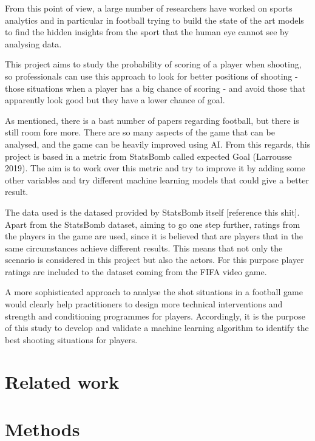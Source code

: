 \documentclass[]{article}
\begin{document}
From this point of view, a large number of researchers have worked on
sports analytics and in particular in football trying to build the state
of the art models to find the hidden insights from the sport that the
human eye cannot see by analysing data.

This project aims to study the probability of scoring of a player when
shooting, so professionals can use this approach to look for better
positions of shooting - those situations when a player has a big chance
of scoring - and avoid those that apparently look good but they have a
lower chance of goal.

As mentioned, there is a bast number of papers regarding football, but
there is still room fore more. There are so many aspects of the game
that can be analysed, and the game can be heavily improved using AI.
From this regards, this project is based in a metric from StatsBomb
called expected Goal (Larrousse 2019). The aim is to work over this
metric and try to improve it by adding some other variables and try
different machine learning models that could give a better result.

The data used is the datased provided by StatsBomb itself {[}reference
this shit{]}. Apart from the StatsBomb dataset, aiming to go one step
further, ratings from the players in the game are used, since it is
believed that are players that in the same circumstances achieve
different results. This means that not only the scenario is considered
in this project but also the actors. For this purpose player ratings are
included to the dataset coming from the FIFA video game.

A more sophisticated approach to analyse the shot situations in a
football game would clearly help practitioners to design more technical
interventions and strength and conditioning programmes for players.
Accordingly, it is the purpose of this study to develop and validate a
machine learning algorithm to identify the best shooting situations for
players.

\hypertarget{related-work}{%
\section{Related work}\label{related-work}}

\hypertarget{methods}{%
\section{Methods}\label{methods}}
\end{document}
